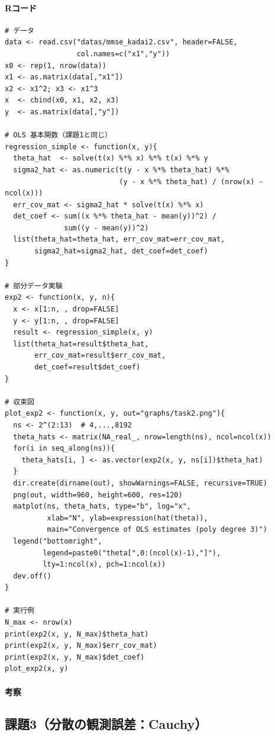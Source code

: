 \paragraph{Rコード}
\begin{verbatim}
# データ
data <- read.csv("datas/mmse_kadai2.csv", header=FALSE,
                 col.names=c("x1","y"))
x0 <- rep(1, nrow(data))
x1 <- as.matrix(data[,"x1"])
x2 <- x1^2; x3 <- x1^3
x  <- cbind(x0, x1, x2, x3)
y  <- as.matrix(data[,"y"])

# OLS 基本関数（課題1と同じ）
regression_simple <- function(x, y){
  theta_hat  <- solve(t(x) %*% x) %*% t(x) %*% y
  sigma2_hat <- as.numeric(t(y - x %*% theta_hat) %*%
                           (y - x %*% theta_hat) / (nrow(x) - ncol(x)))
  err_cov_mat <- sigma2_hat * solve(t(x) %*% x)
  det_coef <- sum((x %*% theta_hat - mean(y))^2) /
              sum((y - mean(y))^2)
  list(theta_hat=theta_hat, err_cov_mat=err_cov_mat,
       sigma2_hat=sigma2_hat, det_coef=det_coef)
}

# 部分データ実験
exp2 <- function(x, y, n){
  x <- x[1:n, , drop=FALSE]
  y <- y[1:n, , drop=FALSE]
  result <- regression_simple(x, y)
  list(theta_hat=result$theta_hat,
       err_cov_mat=result$err_cov_mat,
       det_coef=result$det_coef)
}

# 収束図
plot_exp2 <- function(x, y, out="graphs/task2.png"){
  ns <- 2^(2:13)  # 4,...,8192
  theta_hats <- matrix(NA_real_, nrow=length(ns), ncol=ncol(x))
  for(i in seq_along(ns)){
    theta_hats[i, ] <- as.vector(exp2(x, y, ns[i])$theta_hat)
  }
  dir.create(dirname(out), showWarnings=FALSE, recursive=TRUE)
  png(out, width=960, height=600, res=120)
  matplot(ns, theta_hats, type="b", log="x",
          xlab="N", ylab=expression(hat(theta)),
          main="Convergence of OLS estimates (poly degree 3)")
  legend("bottomright",
         legend=paste0("theta[",0:(ncol(x)-1),"]"),
         lty=1:ncol(x), pch=1:ncol(x))
  dev.off()
}

# 実行例
N_max <- nrow(x)
print(exp2(x, y, N_max)$theta_hat)
print(exp2(x, y, N_max)$err_cov_mat)
print(exp2(x, y, N_max)$det_coef)
plot_exp2(x, y)
\end{verbatim}
\paragraph {考察}


\subsection{課題3（分散の観測誤差：Cauchy）}

